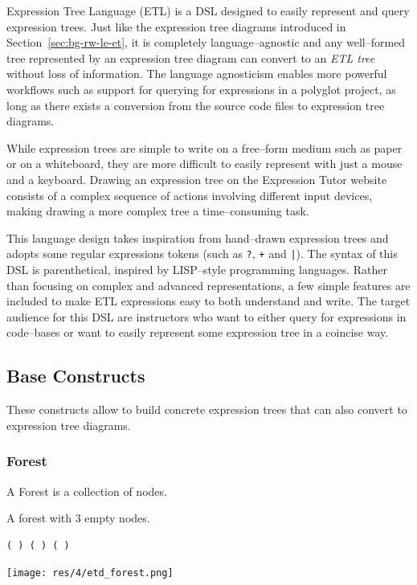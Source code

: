 \begin{chapterBody}
Expression Tree Language (ETL) is a DSL designed to easily represent and query
expression trees. Just like the expression tree diagrams introduced in
Section~\ref{sec:bg-rw-le-et}, it is completely language–agnostic and any
well–formed tree represented by an expression tree diagram can convert to an
\textit{ETL tree} without loss of information.
The language agnosticism enables more powerful workflows such as support for
querying for expressions in a polyglot project, as long as there exists a 
conversion from the source code files to expression tree diagrams.

While expression trees are simple to write on a free–form medium such as paper
or on a whiteboard, they are more difficult to easily represent with just a
mouse and a keyboard. Drawing an expression tree on the Expression Tutor
website consists of a complex sequence of actions involving different input
devices, making drawing a more complex tree a time–consuming task.

This language design takes inspiration from hand–drawn expression trees and 
adopts some regular expressions tokens (such as \texttt{?}, \texttt{+} and
\texttt{|}). The syntax of this DSL is parenthetical, inspired by LISP–style
programming languages.
Rather than focusing on complex and advanced representations, a few simple
features are included to make ETL expressions easy to both understand and write.
The target audience for this DSL are instructors who want to either query for
expressions in code–bases or want to easily represent some expression tree in
a coincise way.

\subsection{Base Constructs}

These constructs allow to build concrete expression trees that can also
convert to expression tree diagrams.

\subsubsection*{Forest}

A Forest is a collection of nodes. 

\begin{minipage}{.33\textwidth}
A forest with 3 empty nodes.
\end{minipage}
\begin{minipage}{.33\textwidth}
\begin{lstlisting}[language=etl]
( ) ( ) ( )
\end{lstlisting} 
\end{minipage}
\begin{minipage}{.33\textwidth}
\texttt{[image: res/4/etd\_forest.png]}
\end{minipage}


\end{chapterBody}
